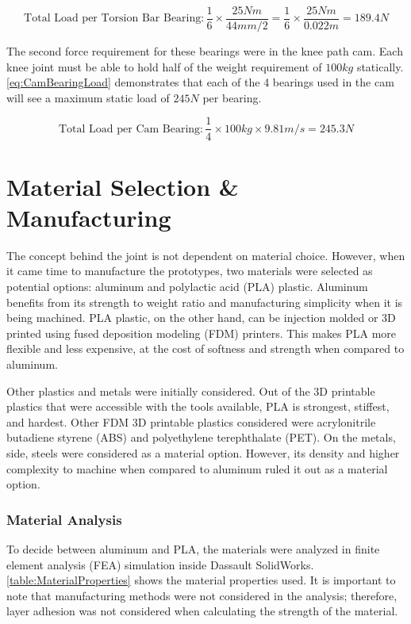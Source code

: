 \begin{equation}
    \text{Total Load per Torsion Bar Bearing}: \frac{1}{6} \times \frac{25Nm}{44mm / 2} = \frac{1}{6} \times \frac{25Nm}{0.022m} = 189.4N
    \label{eq:TorsionBearingLoad}
\end{equation}

The second force requirement for these bearings were in the knee path cam. Each knee joint must be able to hold half of the weight requirement of \(100kg\) statically. \autoref{eq:CamBearingLoad} demonstrates that each of the 4 bearings used in the cam will see a maximum static load of \(245N\) per bearing.

\begin{equation}
    \text{Total Load per Cam Bearing}: \frac{1}{4} \times 100kg \times 9.81m/s = 245.3N
    \label{eq:CamBearingLoad}
\end{equation}


\section{Material Selection \& Manufacturing}
The concept behind the joint is not dependent on material choice. However, when it came time to manufacture the prototypes, two materials were selected as potential options: aluminum and polylactic acid (PLA) plastic. Aluminum benefits from its strength to weight ratio and manufacturing simplicity when it is being machined. PLA plastic, on the other hand, can be injection molded or 3D printed using fused deposition modeling (FDM) printers. This makes PLA more flexible and less expensive, at the cost of softness and strength when compared to aluminum.

Other plastics and metals were initially considered. Out of the 3D printable plastics that were accessible with the tools available, PLA is strongest, stiffest, and hardest. Other FDM 3D printable plastics considered were  acrylonitrile butadiene styrene (ABS) and polyethylene terephthalate (PET). On the metals, side, steels were considered as a material option. However, its density and higher complexity to machine when compared to aluminum ruled it out as a material option.

\subsubsection{Material Analysis}
To decide between aluminum and PLA, the materials were analyzed in finite element analysis (FEA) simulation inside Dassault SolidWorks. \autoref{table:MaterialProperties} shows the material properties used. It is important to note that manufacturing methods were not considered in the analysis; therefore, layer adhesion was not considered when calculating the strength of the material.

